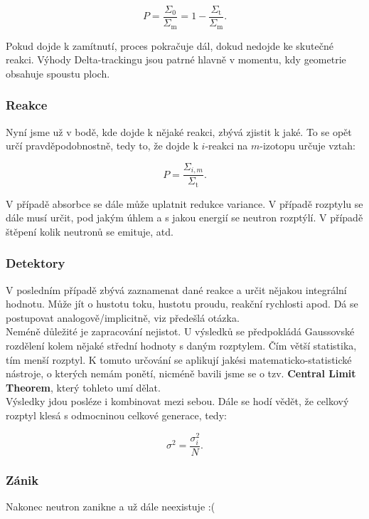 $$ P = \dfrac{\Sigma_0}{\Sigma_\text{m}} = 1 - \dfrac{\Sigma_\text{t}}{\Sigma_\text{m}}. $$

Pokud dojde k zamítnutí, proces pokračuje dál, dokud nedojde ke skutečné reakci. Výhody Delta-trackingu jsou patrné hlavně v momentu, kdy geometrie obsahuje spoustu ploch.

\subsubsection{Reakce}

Nyní jsme už v bodě, kde dojde k nějaké reakci, zbývá zjistit k jaké. To se opět určí pravděpodobnostně, tedy to, že dojde k $i$-reakci na $m$-izotopu určuje vztah:

$$ P = \dfrac{\Sigma_{i,m}}{\Sigma_\text{t}}. $$

V případě absorbce se dále může uplatnit redukce variance. V případě rozptylu se dále musí určit, pod jakým úhlem a s jakou energií se neutron rozptýlí. V případě štěpení kolik neutronů se emituje, atd. 

\subsubsection{Detektory}

V posledním případě zbývá zaznamenat dané reakce a určit nějakou integrální hodnotu. Může jít o hustotu toku, hustotu proudu, reakční rychlosti apod. Dá se postupovat analogově/implicitně, viz předešlá otázka.\\

Neméně důležité je zapracování nejistot. U výsledků se předpokládá Gaussovské rozdělení kolem nějaké střední hodnoty s daným rozptylem. Čím větší statistika, tím menší rozptyl. K tomuto určování se aplikují jakési matematicko-statistické nástroje, o kterých nemám ponětí, nicméně bavili jsme se o tzv. \textbf{Central Limit Theorem}, který tohleto umí dělat.\\

Výsledky jdou posléze i kombinovat mezi sebou. Dále se hodí vědět, že celkový rozptyl klesá s odmocninou celkové generace, tedy:

$$ \sigma^2 = \dfrac{\sigma^2_i}{N}. $$

\subsubsection{Zánik}

Nakonec neutron zanikne a už dále neexistuje :(